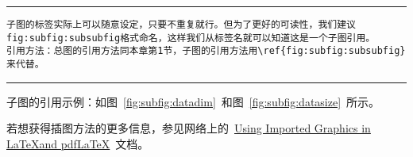 \noindent\hrule

\begin{verbatim}
子图的标签实际上可以随意设定，只要不重复就行。但为了更好的可读性，我们建议fig:subfig:subsubfig格式命名，这样我们从标签名就可以知道这是一个子图引用。
引用方法：总图的引用方法同本章第1节，子图的引用方法用\ref{fig:subfig:subsubfig}来代替。
\end{verbatim}

\noindent\hrule\vspace{1em}

子图的引用示例：如图~\ref{fig:subfig:datadim}~和图~\ref{fig:subfig:datasize}~所示。

若想获得插图方法的更多信息，参见网络上的~\href{ftp://ftp.tex.ac.uk/tex-archive/info/epslatex.pdf}{Using Imported Graphics in \LaTeX and pdf\LaTeX}~文档。 